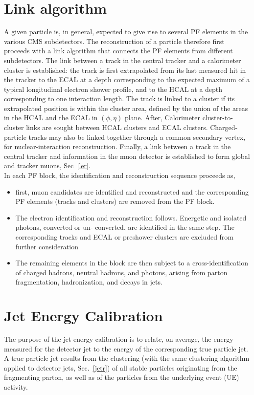 \section{Link algorithm}
A given particle is, in general, expected to give rise to several PF elements in the various CMS
subdetectors. The reconstruction of a particle therefore first proceeds with a
link algorithm that connects the PF elements from different subdetectors.
The link between a track in the central tracker and a calorimeter cluster is established:
the track is first extrapolated from its last measured hit in the tracker to
 the ECAL at a depth corresponding to the expected maximum of a typical longitudinal electron shower
profile, and to the HCAL at a depth corresponding to one interaction length.  
The track is linked to a cluster if its extrapolated position is within the cluster area, defined by the union of the
areas in the HCAL and the ECAL in $(\phi, \eta)$ plane. 
After, Calorimeter cluster-to-cluster links are sought between HCAL clusters and ECAL clusters.
Charged-particle tracks may also be linked together through a common secondary vertex, for
nuclear-interaction reconstruction.
Finally, a link between a track in the central tracker and information in the muon detector is
established to form global and tracker muons, Sec~\ref{ler}.\\

In each PF block, the identification and reconstruction sequence proceeds as,
\begin{itemize} 
\item first, muon candidates are identified and reconstructed and the
corresponding PF elements (tracks and clusters) are removed from the PF block.  
\item The electron identification and reconstruction follows. Energetic and isolated photons, converted or un-
converted, are identified in the same step.  The corresponding tracks and ECAL or preshower
clusters are excluded from further consideration
\item The remaining elements in the block are then subject to a cross-identification of charged hadrons,
neutral hadrons, and photons, arising from parton fragmentation, hadronization, and decays
in jets. 
\end{itemize}

\section{Jet Energy Calibration}
The purpose of the jet energy calibration is to relate, on average, the energy measured for the
detector jet to the energy of the corresponding true particle jet.  A true particle jet results from
the clustering (with the same clustering algorithm applied to detector jets, Sec.~\ref{jetr}) of all stable particles
originating from the fragmenting parton, as well as of the particles from the underlying event
(UE) activity. 

